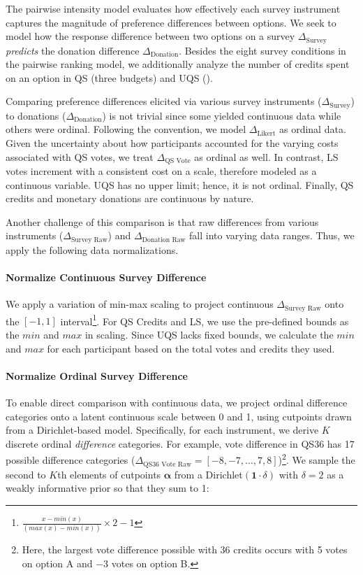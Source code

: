 The pairwise intensity model evaluates how effectively each survey instrument captures the magnitude of preference differences between options. We seek to model how the response difference between two options on a survey $\Delta_{\text{Survey}}$ \emph{predicts} the donation difference $\Delta_{\text{Donation}}$. Besides the eight survey conditions in the pairwise ranking model, we additionally analyze the number of credits spent on an option in QS (three budgets) and UQS ().

Comparing preference differences elicited via various survey instruments ($\Delta_{\text{Survey}}$) to donations ($\Delta_{\text{Donation}}$) is not trivial since some yielded continuous data while others were ordinal. Following the convention, we model $\Delta_{\text{Likert}}$ as ordinal data. Given the uncertainty about how participants accounted for the varying costs associated with QS votes, we treat $\Delta_{\text{QS Vote}}$ as ordinal as well. In contrast, LS votes increment with a consistent cost on a scale, therefore modeled as a continuous variable. UQS has no upper limit; hence, it is not ordinal. Finally, QS credits and monetary donations are continuous by nature.

Another challenge of this comparison is that raw differences from various instruments ($\Delta_{\text{Survey Raw}}$) and $\Delta_{\text{Donation Raw}}$ fall into varying data ranges. Thus, we apply the following data normalizations.

\paragraph{Normalize Continuous Survey Difference} We apply a variation of min-max scaling to project continuous $\Delta_{\text{Survey Raw}}$ onto the $[-1,1]$ interval\footnote{$\frac{x-min(x)}{(max(x) - min(x))}\times 2 - 1$}. For QS Credits and LS, we use the pre-defined bounds as the $min$ and $max$ in scaling. Since UQS lacks fixed bounds, we calculate the $min$ and $max$ for each participant based on the total votes and credits they used.

\paragraph{Normalize Ordinal Survey Difference} 
To enable direct comparison with continuous data, we project ordinal difference categories onto a latent continuous scale between 0 and 1, using cutpoints drawn from a Dirichlet-based model. Specifically, for each instrument, we derive $K$ discrete ordinal \emph{difference} categories. For example, vote difference in QS36 has 17 possible difference categories ($\Delta_{\text{QS36 Vote Raw}} = [-8, -7, ..., 7, 8]$)\footnote{Here, the largest vote difference possible with 36 credits occurs with 5 votes on option A and $-3$ votes on option B.}. We sample the second to $K$th elements of cutpoints \(\boldsymbol{\alpha}\) from a Dirichlet$(\mathbf{1}\cdot\delta)$ with $\delta=2$ as a weakly informative prior so that they sum to 1:

